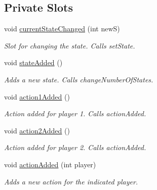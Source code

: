 \subsection*{Private Slots}
\begin{DoxyCompactItemize}
\item 
\mbox{\label{classSGGameHandler_a806f46e7a60e2c17530e6786245f7455}} 
void \hyperlink{classSGGameHandler_a806f46e7a60e2c17530e6786245f7455}{current\+State\+Changed} (int newS)
\begin{DoxyCompactList}\small\item\em Slot for changing the state. Calls set\+State. \end{DoxyCompactList}\item 
\mbox{\label{classSGGameHandler_a5e8650d00efcc8d41bfb04abb7edeb7b}} 
void \hyperlink{classSGGameHandler_a5e8650d00efcc8d41bfb04abb7edeb7b}{state\+Added} ()
\begin{DoxyCompactList}\small\item\em Adds a new state. Calls change\+Number\+Of\+States. \end{DoxyCompactList}\item 
\mbox{\label{classSGGameHandler_aaf22c32b0431b81c05646e8acb2f6511}} 
void \hyperlink{classSGGameHandler_aaf22c32b0431b81c05646e8acb2f6511}{action1\+Added} ()
\begin{DoxyCompactList}\small\item\em Action added for player 1. Calls action\+Added. \end{DoxyCompactList}\item 
\mbox{\label{classSGGameHandler_abeb7b79db6493e8c2fdddb1e83b4dc01}} 
void \hyperlink{classSGGameHandler_abeb7b79db6493e8c2fdddb1e83b4dc01}{action2\+Added} ()
\begin{DoxyCompactList}\small\item\em Action added for player 2. Calls action\+Added. \end{DoxyCompactList}\item 
\mbox{\label{classSGGameHandler_a6ead4477a6bc36eb73f220159ea2fa91}} 
void \hyperlink{classSGGameHandler_a6ead4477a6bc36eb73f220159ea2fa91}{action\+Added} (int player)
\begin{DoxyCompactList}\small\item\em Adds a new action for the indicated player. \end{DoxyCompactList}\item 

\end{DoxyCompactItemize}

